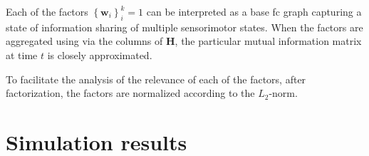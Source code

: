 Each of the factors $\left\lbrace\bm{w}_i\right\rbrace^k_i=1$ can be interpreted as a base \ac{fc} graph capturing
a state of information sharing of multiple sensorimotor states. When the factors are aggregated using via the columns of $\bm{H}$, the particular mutual information matrix at time $t$ is closely approximated.

To facilitate the analysis of the relevance of each of the factors, after factorization, the factors are normalized according to the $L_2$-norm. 

%




\section{Simulation results}

